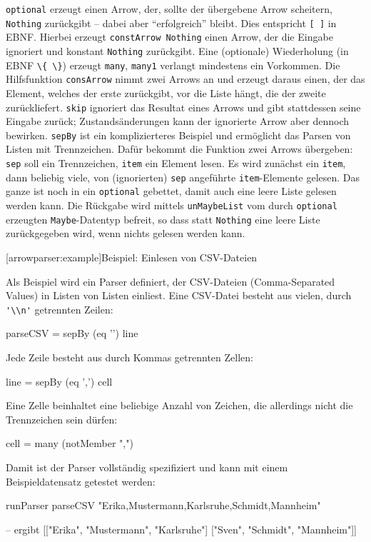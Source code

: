 \documentclass[12pt, a4paper, bibgerm]{scrbook}
\newcommand\icode[1]{\lstinline?#1?}
\newcommand\lsection{}
\begin{document}
\icode{optional} erzeugt einen Arrow, der, sollte der übergebene Arrow
scheitern, \icode{Nothing} zurückgibt -- dabei aber "`erfolgreich"'
bleibt. Dies entspricht \icode{[ ]} in EBNF. Hierbei erzeugt
\icode{constArrow Nothing} einen Arrow, der die Eingabe ignoriert und
konstant \icode{Nothing} zurückgibt. Eine (optionale) Wiederholung (in EBNF
\icode{\{ \}}) erzeugt \icode{many}, \icode{many1} verlangt mindestens
ein Vorkommen. Die Hilfsfunktion \icode{consArrow} nimmt zwei
Arrows an und erzeugt daraus einen, der das Element, welches der erste
zurückgibt, vor die Liste hängt, die der zweite zurückliefert.
\icode{skip} ignoriert das Resultat eines Arrows und gibt
stattdessen seine Eingabe zurück; Zustandsänderungen kann der
ignorierte Arrow aber dennoch bewirken. \icode{sepBy} ist ein
komplizierteres Beispiel und ermöglicht das Parsen von Listen mit
Trennzeichen. Dafür bekommt die Funktion zwei Arrows übergeben:
\icode{sep} soll ein Trennzeichen, \icode{item} ein Element lesen. Es
wird zunächst ein \icode{item}, dann beliebig viele, von (ignorierten)
\icode{sep} angeführte \icode{item}-Elemente gelesen. Das ganze ist noch
in ein \icode{optional} gebettet, damit auch eine leere Liste gelesen
werden kann. Die Rückgabe wird mittels \icode{unMaybeList} vom durch
\icode{optional} erzeugten \icode{Maybe}-Datentyp befreit, so dass statt
\icode{Nothing} eine leere Liste zurückgegeben wird, wenn nichts gelesen
werden kann.

\lsection[arrowparser:example]{Beispiel: Einlesen von CSV-Dateien}

Als Beispiel wird ein Parser definiert, der CSV-Dateien (Comma-Separated
Values) in Listen von Listen einliest. Eine CSV-Datei besteht aus
vielen, durch \icode{'\\n'} getrennten Zeilen:
\begin{code}
parseCSV = sepBy (eq '\n') line
\end{code}
Jede Zeile besteht aus durch Kommas getrennten Zellen:
\begin{code}
line = sepBy (eq ',') cell
\end{code}
Eine Zelle beinhaltet eine beliebige Anzahl von Zeichen, die allerdings
nicht die Trennzeichen sein dürfen:
\begin{code}
cell = many (notMember ",\n")
\end{code}
Damit ist der Parser vollständig spezifiziert und kann mit einem
Beispieldatensatz getestet werden:
\begin{code}
runParser parseCSV "Erika,Mustermann,Karlsruhe\nSven,Schmidt,Mannheim"

-- ergibt [["Erika", "Mustermann", "Karlsruhe"]
           ["Sven",  "Schmidt",    "Mannheim"]]
\end{code}
\end{document}
